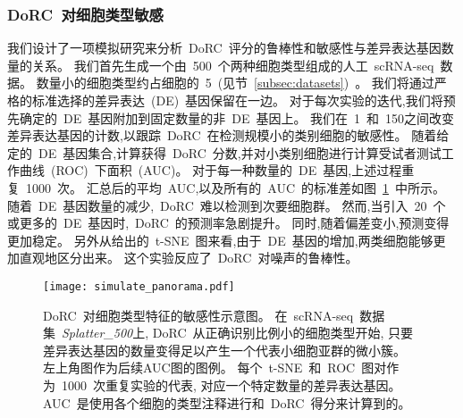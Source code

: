 \subsubsection{DoRC~对细胞类型敏感}
我们设计了一项模拟研究来分析~DoRC~评分的鲁棒性和敏感性与差异表达基因数量的关系。
我们首先生成一个由~500~个两种细胞类型组成的人工~scRNA-seq~数据。
数量小的细胞类型约占细胞的~5\％~(见节~\ref{subsec:datasets})~。
我们将通过严格的标准选择的差异表达~(DE)~基因保留在一边。
对于每次实验的迭代,我们将预先确定的~DE~基因附加到固定数量的非~DE~基因上。
我们在~1~和~150之间改变差异表达基因的计数,以跟踪~DoRC~在检测规模小的类别细胞的敏感性。
随着给定的~DE~基因集合,计算获得~DoRC~分数,并对小类别细胞进行计算受试者测试工作曲线~(ROC)~下面积~(AUC)。
对于每一种数量的~DE~基因,上述过程重复~1000~次。
汇总后的平均~AUC,以及所有的~AUC~的标准差如图~\ref{fig:simulate:roc}~中所示。
随着~DE~基因数量的减少,~DoRC~难以检测到次要细胞群。
然而,当引入~20~个或更多的~DE~基因时,~DoRC~的预测率急剧提升。
同时,随着偏差变小,预测变得更加稳定。
另外从给出的~t-SNE~图来看,由于~DE~基因的增加,两类细胞能够更加直观地区分出来。
这个实验反应了~DoRC~对噪声的鲁棒性。

\begin{figure}[!htbp]
    \centering
    \texttt{[image: simulate\_panorama.pdf]}
    \caption{
    DoRC~对细胞类型特征的敏感性示意图。
    在~scRNA-seq~数据集~\textit{Splatter\_500}上,
    DoRC~从正确识别比例小的细胞类型开始,
    只要差异表达基因的数量变得足以产生一个代表小细胞亚群的微小簇。
    左上角图作为后续AUC图的图例。
    每个~t-SNE~和~ROC~图对作为~1000~次重复实验的代表,
    对应一个特定数量的差异表达基因。
    AUC~是使用各个细胞的类型注释进行和~DoRC~得分来计算到的。
    }
    \label{fig:simulate:roc}
\end{figure}

